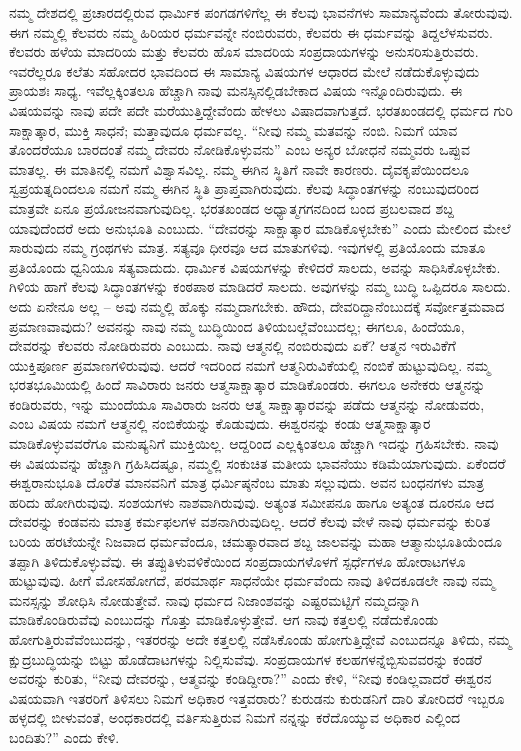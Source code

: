 \vskip 2pt

ನಮ್ಮ ದೇಶದಲ್ಲಿ ಪ್ರಚಾರದಲ್ಲಿರುವ ಧಾರ್ಮಿಕ ಪಂಗಡಗಳಿಗೆಲ್ಲ ಈ ಕೆಲವು ಭಾವನೆಗಳು ಸಾಮಾನ್ಯವೆಂದು ತೋರುವುವು. ಈಗ ನಮ್ಮಲ್ಲಿ ಕೆಲವರು ನಮ್ಮ ಹಿರಿಯರ ಧರ್ಮವನ್ನೇ ನಂಬಿರುವರು, ಕೆಲವರು ಈ ಧರ್ಮವನ್ನು ತಿದ್ದಲೆಳಸುವರು. ಕೆಲವರು ಹಳೆಯ ಮಾದರಿಯ ಮತ್ತು ಕೆಲವರು ಹೊಸ ಮಾದರಿಯ ಸಂಪ್ರದಾಯಗಳನ್ನು ಅನುಸರಿಸುತ್ತಿರುವರು. ಇವರೆಲ್ಲರೂ ಕಲೆತು ಸಹೋದರ ಭಾವದಿಂದ ಈ ಸಾಮಾನ್ಯ ವಿಷಯಗಳ ಆಧಾರದ ಮೇಲೆ ನಡೆದುಕೊಳ್ಳುವುದು ಪ್ರಾಯಶಃ ಸಾಧ್ಯ. ಇವೆಲ್ಲಕ್ಕಿಂತಲೂ ಹೆಚ್ಚಾಗಿ ನಾವು ಮನಸ್ಸಿನಲ್ಲಿಡಬೇಕಾದ ವಿಷಯ ಇನ್ನೊಂದಿರುವುದು. ಈ ವಿಷಯವನ್ನು ನಾವು ಪದೇ ಪದೇ ಮರೆಯುತ್ತಿದ್ದೇವೆಂದು ಹೇಳಲು ವಿಷಾದವಾಗುತ್ತದೆ. ಭರತಖಂಡದಲ್ಲಿ ಧರ್ಮದ ಗುರಿ ಸಾಕ್ಷಾತ್ಕಾರ, ಮುಕ್ತಿ ಸಾಧನೆ; ಮತ್ತಾವುದೂ ಧರ್ಮವಲ್ಲ. “ನೀವು ನಮ್ಮ ಮತವನ್ನು ನಂಬಿ. ನಿಮಗೆ ಯಾವ ತೊಂದರೆಯೂ ಬಾರದಂತೆ ನಮ್ಮ ದೇವರು ನೋಡಿಕೊಳ್ಳುವನು” ಎಂಬ ಅನ್ಯರ ಬೋಧನೆ ನಮ್ಮವರು ಒಪ್ಪುವ ಮಾತಲ್ಲ. ಈ ಮಾತಿನಲ್ಲಿ ನಮಗೆ ವಿಶ್ವಾಸವಿಲ್ಲ. ನಮ್ಮ ಈಗಿನ ಸ್ಥಿತಿಗೆ ನಾವೇ ಕಾರಣರು. ದೈವಕೃಪೆಯಿಂದಲೂ ಸ್ವಪ್ರಯತ್ನದಿಂದಲೂ ನಮಗೆ ನಮ್ಮ ಈಗಿನ ಸ್ಥಿತಿ ಪ್ರಾಪ್ತವಾಗಿರುವುದು. ಕೆಲವು ಸಿದ್ಧಾಂತಗಳನ್ನು ನಂಬುವುದರಿಂದ ಮಾತ್ರವೇ ಏನೂ ಪ್ರಯೋಜನವಾಗುವುದಿಲ್ಲ. ಭರತಖಂಡದ ಅಧ್ಯಾತ್ಮಗಗನದಿಂದ ಬಂದ ಪ್ರಬಲವಾದ ಶಬ್ದ ಯಾವುದೆಂದರೆ ಅದು ಅನುಭೂತಿ ಎಂಬುದು. “ದೇವರನ್ನು ಸಾಕ್ಷಾತ್ಕಾರ ಮಾಡಿಕೊಳ್ಳಬೇಕು” ಎಂದು ಮೇಲಿಂದ ಮೇಲೆ ಸಾರುವುದು ನಮ್ಮ ಗ್ರಂಥಗಳು ಮಾತ್ರ. ಸತ್ಯವೂ ಧೀರವೂ ಆದ ಮಾತುಗಳಿವು. ಇವುಗಳಲ್ಲಿ ಪ್ರತಿಯೊಂದು ಮಾತೂ ಪ್ರತಿಯೊಂದು ಧ್ವನಿಯೂ ಸತ್ಯವಾದುದು. ಧಾರ್ಮಿಕ ವಿಷಯಗಳನ್ನು ಕೇಳಿದರೆ ಸಾಲದು, ಅವನ್ನು ಸಾಧಿಸಿಕೊಳ್ಳಬೇಕು. ಗಿಳಿಯ ಹಾಗೆ ಕೆಲವು ಸಿದ್ಧಾಂತಗಳನ್ನು ಕಂಠಪಾಠ ಮಾಡಿದರೆ ಸಾಲದು. ಅವುಗಳನ್ನು ನಮ್ಮ ಬುದ್ಧಿ ಒಪ್ಪಿದರೂ ಸಾಲದು. ಅದು ಏನೇನೂ ಅಲ್ಲ – ಅವು ನಮ್ಮಲ್ಲಿ ಹೊಕ್ಕು ನಮ್ಮದಾಗಬೇಕು. ಹೌದು, ದೇವರಿದ್ದಾನೆಂಬುದಕ್ಕೆ ಸರ್ವೋತ್ತಮವಾದ ಪ್ರಮಾಣವಾವುದು? ಅವನನ್ನು ನಾವು ನಮ್ಮ ಬುದ್ಧಿಯಿಂದ ತಿಳಿಯಬಲ್ಲೆವೆಂಬುದಲ್ಲ; ಈಗಲೂ, ಹಿಂದೆಯೂ, ದೇವರನ್ನು ಕೆಲವರು ನೋಡಿರುವರು ಎಂಬುದು. ನಾವು ಆತ್ಮನಲ್ಲಿ ನಂಬಿರುವುದು ಏಕೆ? ಆತ್ಮನ ಇರುವಿಕೆಗೆ ಯುಕ್ತಿಪೂರ್ಣ ಪ್ರಮಾಣಗಳಿರುವುವು. ಆದರೆ ಇದರಿಂದ ನಮಗೆ ಆತ್ಮನಿರುವಿಕೆಯಲ್ಲಿ ನಂಬಿಕೆ ಹುಟ್ಟುವುದಿಲ್ಲ. ನಮ್ಮ ಭರತಭೂಮಿಯಲ್ಲಿ ಹಿಂದೆ ಸಾವಿರಾರು ಜನರು ಆತ್ಮಸಾಕ್ಷಾತ್ಕಾರ ಮಾಡಿಕೊಂಡರು. ಈಗಲೂ ಅನೇಕರು ಆತ್ಮನನ್ನು ಕಂಡಿರುವರು, ಇನ್ನು ಮುಂದೆಯೂ ಸಾವಿರಾರು ಜನರು ಆತ್ಮ ಸಾಕ್ಷಾತ್ಕಾರವನ್ನು ಪಡೆದು ಆತ್ಮನನ್ನು ನೋಡುವರು, ಎಂಬ ವಿಷಯ ನಮಗೆ ಆತ್ಮನಲ್ಲಿ ನಂಬಿಕೆಯನ್ನು ಕೊಡುವುದು. ಈಶ್ವರನನ್ನು ಕಂಡು ಆತ್ಮಸಾಕ್ಷಾತ್ಕಾರ ಮಾಡಿಕೊಳ್ಳುವವರೆಗೂ ಮನುಷ್ಯನಿಗೆ ಮುಕ್ತಿಯಿಲ್ಲ. ಆದ್ದರಿಂದ ಎಲ್ಲಕ್ಕಿಂತಲೂ ಹೆಚ್ಚಾಗಿ ಇದನ್ನು ಗ್ರಹಿಸಬೇಕು. ನಾವು ಈ ವಿಷಯವನ್ನು ಹೆಚ್ಚಾಗಿ ಗ್ರಹಿಸಿದಷ್ಟೂ, ನಮ್ಮಲ್ಲಿ ಸಂಕುಚಿತ ಮತೀಯ ಭಾವನೆಯು ಕಡಿಮೆಯಾಗುವುದು. ಏಕೆಂದರೆ ಈಶ್ವರಾನುಭೂತಿ ದೊರೆತ ಮಾನವನಿಗೆ ಮಾತ್ರ ಧರ್ಮಿಷ್ಠನೆಂಬ ಮಾತು ಸಲ್ಲುವುದು. ಅವನ ಬಂಧನಗಳು ಮಾತ್ರ ಹರಿದು ಹೋಗಿರುವುವು. ಸಂಶಯಗಳು ನಾಶವಾಗಿರುವುವು. ಅತ್ಯಂತ ಸಮೀಪನೂ ಹಾಗೂ ಅತ್ಯಂತ ದೂರನೂ ಆದ ದೇವರನ್ನು ಕಂಡವನು ಮಾತ್ರ ಕರ್ಮಫಲಗಳ ವಶನಾಗಿರುವುದಿಲ್ಲ. ಆದರೆ ಕೆಲವು ವೇಳೆ ನಾವು ಧರ್ಮವನ್ನು ಕುರಿತ ಬರಿಯ ಹರಟೆಯನ್ನೇ ನಿಜವಾದ ಧರ್ಮವೆಂದೂ, ಚಮತ್ಕಾರವಾದ ಶಬ್ದ ಜಾಲವನ್ನು ಮಹಾ ಆತ್ಮಾನುಭೂತಿಯೆಂದೂ ತಪ್ಪಾಗಿ ತಿಳಿದುಕೊಳ್ಳುವೆವು. ಈ ತಪ್ಪು\break ತಿಳುವಳಿಕೆಯಿಂದ ಸಂಪ್ರದಾಯಗಳೊಳಗೆ ಸ್ಪರ್ಧೆಗಳೂ ಹೋರಾಟಗಳೂ ಹುಟ್ಟುವುವು. ಹೀಗೆ ಮೋಸಹೋಗದೆ, ಪರಮಾರ್ಥ ಸಾಧನೆಯೇ ಧರ್ಮವೆಂದು ನಾವು ತಿಳಿದಕೂಡಲೇ ನಾವು ನಮ್ಮ ಮನಸ್ಸನ್ನು ಶೋಧಿಸಿ ನೋಡುತ್ತೇವೆ. ನಾವು ಧರ್ಮದ ನಿಜಾಂಶವನ್ನು ಎಷ್ಟರಮಟ್ಟಿಗೆ ನಮ್ಮದನ್ನಾಗಿ ಮಾಡಿಕೊಂಡಿರುವೆವು ಎಂಬುದನ್ನು ಗೊತ್ತು ಮಾಡಿಕೊಳ್ಳುತ್ತೇವೆ. ಆಗ ನಾವು ಕತ್ತಲಲ್ಲಿ ನಡೆದುಕೊಂಡು ಹೋಗುತ್ತಿರುವೆವೆಂಬುದನ್ನು, ಇತರರನ್ನು ಅದೇ ಕತ್ತಲಲ್ಲಿ ನಡೆಸಿಕೊಂಡು ಹೋಗುತ್ತಿದ್ದೇವೆ ಎಂಬುದನ್ನೂ ತಿಳಿದು, ನಮ್ಮ ಕ್ಷುದ್ರಬುದ್ಧಿಯನ್ನು ಬಿಟ್ಟು ಹೊಡೆದಾಟಗಳನ್ನು ನಿಲ್ಲಿಸುವೆವು. ಸಂಪ್ರದಾಯಗಳ ಕಲಹಗಳನ್ನೆಬ್ಬಿಸುವವರನ್ನು ಕಂಡರೆ ಅವರನ್ನು ಕುರಿತು, “ನೀವು ದೇವರನ್ನು, ಆತ್ಮವನ್ನು ಕಂಡಿದ್ದೀರಾ?” ಎಂದು ಕೇಳಿ, “ನೀವು ಕಂಡಿಲ್ಲವಾದರೆ ಈಶ್ವರನ ವಿಷಯವಾಗಿ ಇತರರಿಗೆ ತಿಳಿಸಲು ನಿಮಗೆ ಅಧಿಕಾರ ಇತ್ತವರಾರು? ಕುರುಡನು ಕುರುಡನಿಗೆ ದಾರಿ ತೋರಿದರೆ ಇಬ್ಬರೂ ಹಳ್ಳದಲ್ಲಿ ಬೀಳುವಂತೆ, ಅಂಧಕಾರದಲ್ಲಿ ವರ್ತಿಸುತ್ತಿರುವ ನಿಮಗೆ ನನ್ನನ್ನು ಕರೆದೊಯ್ಯುವ ಅಧಿಕಾರ ಎಲ್ಲಿಂದ ಬಂದಿತು?” ಎಂದು ಕೇಳಿ.

